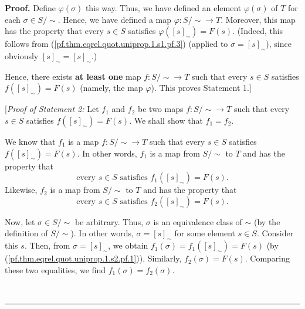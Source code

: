 \documentclass[numbers=enddot,12pt,final,onecolumn,notitlepage]{scrartcl}%
\numberwithin{exer}{subsection}
\theoremstyle{definition}
\newenvironment{fineprint}{\begin{small}}{\end{small}}
\newenvironment{proof}[1][Proof]{\noindent\textbf{#1.} }{\ \rule{0.5em}{0.5em}}
\begin{document}
\begin{fineprint}
\begin{proof}
Define $\varphi\left(  \sigma\right)  $ this way. Thus, we have defined an
element $\varphi\left(  \sigma\right)  $ of $T$ for each $\sigma\in\left.
S/\sim\right.  $. Hence, we have defined a map $\varphi:\left.  S/\sim\right.
\rightarrow T$. Moreover, this map has the property that every $s\in S$
satisfies $\varphi\left(  \left[  s\right]  _{\sim}\right)  =F\left(
s\right)  $. (Indeed, this follows from
(\ref{pf.thm.eqrel.quot.uniprop.1.s1.pf.3}) (applied to $\sigma=\left[
s\right]  _{\sim}$), since obviously $\left[  s\right]  _{\sim}=\left[
s\right]  _{\sim}$.)

Hence, there exists \textbf{at least one} map $f:\left.  S/\sim\right.
\rightarrow T$ such that every $s\in S$ satisfies $f\left(  \left[  s\right]
_{\sim}\right)  =F\left(  s\right)  $ (namely, the map $\varphi$). This proves
Statement 1.]

[\textit{Proof of Statement 2:} Let $f_{1}$ and $f_{2}$ be two maps $f:\left.
S/\sim\right.  \rightarrow T$ such that every $s\in S$ satisfies $f\left(
\left[  s\right]  _{\sim}\right)  =F\left(  s\right)  $. We shall show that
$f_{1}=f_{2}$.

We know that $f_{1}$ is a map $f:\left.  S/\sim\right.  \rightarrow T$ such
that every $s\in S$ satisfies $f\left(  \left[  s\right]  _{\sim}\right)
=F\left(  s\right)  $. In other words, $f_{1}$ is a map from $\left.
S/\sim\right.  $ to $T$ and has the property that
\begin{equation}
\text{every }s\in S\text{ satisfies }f_{1}\left(  \left[  s\right]  _{\sim
}\right)  =F\left(  s\right)  . \label{pf.thm.eqrel.quot.uniprop.1.s2.pf.1}%
\end{equation}
Likewise, $f_{2}$ is a map from $\left.  S/\sim\right.  $ to $T$ and has the
property that
\begin{equation}
\text{every }s\in S\text{ satisfies }f_{2}\left(  \left[  s\right]  _{\sim
}\right)  =F\left(  s\right)  . \label{pf.thm.eqrel.quot.uniprop.1.s2.pf.2}%
\end{equation}


Now, let $\sigma\in\left.  S/\sim\right.  $ be arbitrary. Thus, $\sigma$ is an
equivalence class of $\sim$ (by the definition of $S/\sim$). In other words,
$\sigma=\left[  s\right]  _{\sim}$ for some element $s\in S$. Consider this
$s$. Then, from $\sigma=\left[  s\right]  _{\sim}$, we obtain $f_{1}\left(
\sigma\right)  =f_{1}\left(  \left[  s\right]  _{\sim}\right)  =F\left(
s\right)  $ (by (\ref{pf.thm.eqrel.quot.uniprop.1.s2.pf.1})). Similarly,
$f_{2}\left(  \sigma\right)  =F\left(  s\right)  $. Comparing these two
equalities, we find $f_{1}\left(  \sigma\right)  =f_{2}\left(  \sigma\right)
$.


\end{proof}
\end{fineprint}
\end{document}
